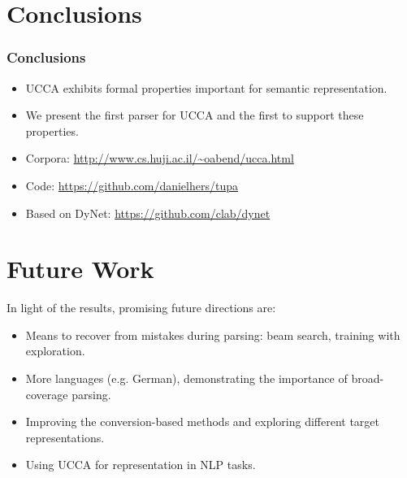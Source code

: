 \documentclass[t]{beamer}
\begin{document}
\section{Conclusions}

\begin{frame}
\frametitle{Conclusions}
\begin{itemize}
 \item UCCA exhibits formal properties important for semantic representation.
 \item We present the first parser for UCCA and the first to support these properties.
\end{itemize}

\vfill
\pause
\begin{itemize}
 \item Corpora: \url{http://www.cs.huji.ac.il/~oabend/ucca.html}
 \item Code: \url{https://github.com/danielhers/tupa}
 \item Based on DyNet: \url{https://github.com/clab/dynet}
\end{itemize}
\end{frame}



\section{Future Work}

\begin{frame}
In light of the results, promising future directions are:
\begin{itemize}
 \item Means to recover from mistakes during parsing:
 beam search, training with exploration.
 \item More languages (e.g. German),
 demonstrating the importance of broad-coverage parsing.
 \item Improving the conversion-based methods and exploring different target representations.
 \item Using UCCA for representation in NLP tasks.
\end{itemize}
\end{frame}
\end{document}
